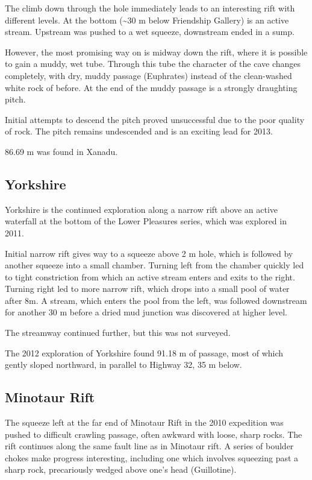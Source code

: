 The climb down through the hole immediately leads to an interesting rift
with different levels. At the bottom (\textasciitilde{}30 m below
Friendship Gallery) is an active stream. Upstream was pushed to a wet
squeeze, downstream ended in a sump.

However, the most promising way on is midway down the rift, where it is
possible to gain a muddy, wet tube. Through this tube the character of
the cave changes completely, with dry, muddy passage (Euphrates) instead
of the clean-washed white rock of before. At the end of the muddy
passage is a strongly draughting pitch.

Initial attempts to descend the pitch proved unsuccessful due to the
poor quality of rock. The pitch remains undescended and is an exciting
lead for 2013.

86.69 m was found in Xanadu.

\subsection{Yorkshire}\label{yorkshire}

Yorkshire is the continued exploration along a narrow rift above an
active waterfall at the bottom of the Lower Pleasures series, which was
explored in 2011.

Initial narrow rift gives way to a squeeze above 2 m hole, which is
followed by another squeeze into a small chamber. Turning left from the
chamber quickly led to tight constriction from which an active stream
enters and exits to the right. Turning right led to more narrow rift,
which drops into a small pool of water after 8m. A stream, which enters
the pool from the left, was followed downstream for another 30 m before
a dried mud junction was discovered at higher level.

The streamway continued further, but this was not surveyed.

The 2012 exploration of Yorkshire found 91.18 m of passage, most of
which gently sloped northward, in parallel to Highway 32, 35 m below.

\subsection{Minotaur Rift}\label{minotaur-rift}

The squeeze left at the far end of Minotaur Rift in the 2010 expedition
was pushed to difficult crawling passage, often awkward with loose,
sharp rocks. The rift continues along the same fault line as in Minotaur
rift. A series of boulder chokes make progress interesting, including
one which involves squeezing past a sharp rock, precariously wedged
above one's head (Guillotine).

